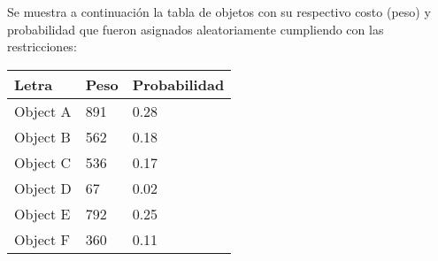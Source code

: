 \documentclass[10pt,letterpaper]{article}
\begin{document}
Se muestra a continuación la tabla de objetos con su respectivo costo (peso) y probabilidad 
        que fueron asignados aleatoriamente cumpliendo con las restricciones: 
\begin{center}
\begin{tabu} to 0.6\textwidth { | X[l] | X[l] | X[l] | } 
\hline
{}
\textbf{Letra} & \textbf{Peso} & \textbf{Probabilidad}\\
\hline
Object A & 891 & 0.28 \\
\hline
Object B & 562 & 0.18 \\
\hline
Object C & 536 & 0.17 \\
\hline
Object D & 67 & 0.02 \\
\hline
Object E & 792 & 0.25 \\
\hline
Object F & 360 & 0.11 \\
\hline
\end{tabu} \\
\end{center}
\end{document}
